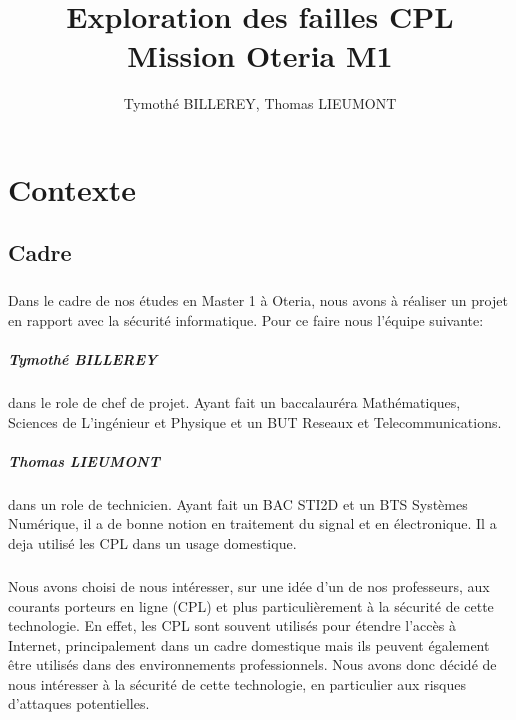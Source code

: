 \documentclass[a4paper,twocolumn]{report}
\title{\Huge{Exploration des failles CPL}\\Mission Oteria M1}
\author{Tymothé BILLEREY, Thomas LIEUMONT}
\date{}
\begin{document}
\maketitle
\newpage %
\newpage
{}
\tableofcontents
\pagebreak

\chapter{Contexte}

\section{Cadre}
\paragraph{}Dans le cadre de nos études en Master 1 à Oteria, nous avons à réaliser un projet en rapport avec la sécurité informatique. Pour ce faire nous l'équipe suivante:

\paragraph{Tymothé BILLEREY} dans le role de chef de projet. Ayant fait un baccalauréra Mathématiques,
Sciences de L'ingénieur et Physique et un BUT Reseaux et Telecommunications.

\paragraph{Thomas LIEUMONT} dans un role de technicien. Ayant fait un BAC STI2D et un BTS Systèmes Numérique, il a de bonne notion en traitement du signal et en électronique. Il a deja utilisé les CPL dans un usage domestique.

\paragraph{}Nous avons choisi de nous intéresser, sur une idée d'un de nos professeurs, aux courants porteurs en ligne (CPL) et plus particulièrement à la sécurité de cette technologie. En effet, les CPL sont souvent utilisés pour étendre l'accès à Internet, principalement dans un cadre domestique mais ils peuvent également être utilisés dans des environnements professionnels. Nous avons donc décidé de nous intéresser à la sécurité de cette technologie, en particulier aux risques d'attaques potentielles.
\end{document}
